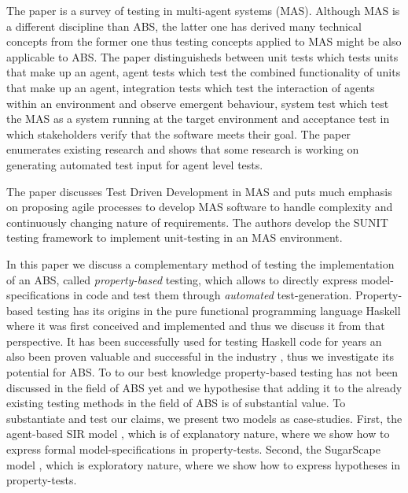 The paper \cite{nguyen_testing_2011} is a survey of testing in multi-agent systems (MAS). Although MAS is a different discipline than ABS, the latter one has derived many technical concepts from the former one thus testing concepts applied to MAS might be also applicable to ABS. The paper distinguisheds between unit tests which tests units that make up an agent, agent tests which test the combined functionality of units that make up an agent, integration tests which test the interaction of agents within an environment and observe emergent behaviour, system test which test the MAS as a system running at the target environment and acceptance test in which stakeholders verify that the software meets their goal. The paper enumerates existing research and shows that some research is working on generating automated test input for agent level tests.

The paper \cite{tiryaki_sunit:_2007} discusses Test Driven Development in MAS and puts much emphasis on proposing agile processes to develop MAS software to handle complexity and continuously changing nature of requirements. The authors develop the SUNIT testing framework to implement unit-testing in an MAS environment.

In this paper we discuss a complementary method of testing the implementation of an ABS, called \textit{property-based} testing, which allows to directly express model-specifications in code and test them through \textit{automated} test-generation. Property-based testing has its origins \cite{claessen_quickcheck:_2000, claessen_testing_2002, runciman_smallcheck_2008} in the pure functional programming language Haskell \cite{hudak_history_2007} where it was first conceived and implemented and thus we discuss it from that perspective. It has been successfully used for testing Haskell code for years an also been proven valuable and successful in the industry \cite{hughes_quickcheck_2007}, thus we investigate its potential for ABS. To to our best knowledge property-based testing has not been discussed in the field of ABS yet and we hypothesise that adding it to the already existing testing methods in the field of ABS is of substantial value. To substantiate and test our claims, we present two models as case-studies. First, the agent-based SIR model \cite{macal_agent-based_2010}, which is of explanatory nature, where we show how to express formal model-specifications in property-tests. Second, the SugarScape model \cite{epstein_growing_1996}, which is exploratory nature, where we show how to express hypotheses in property-tests.

